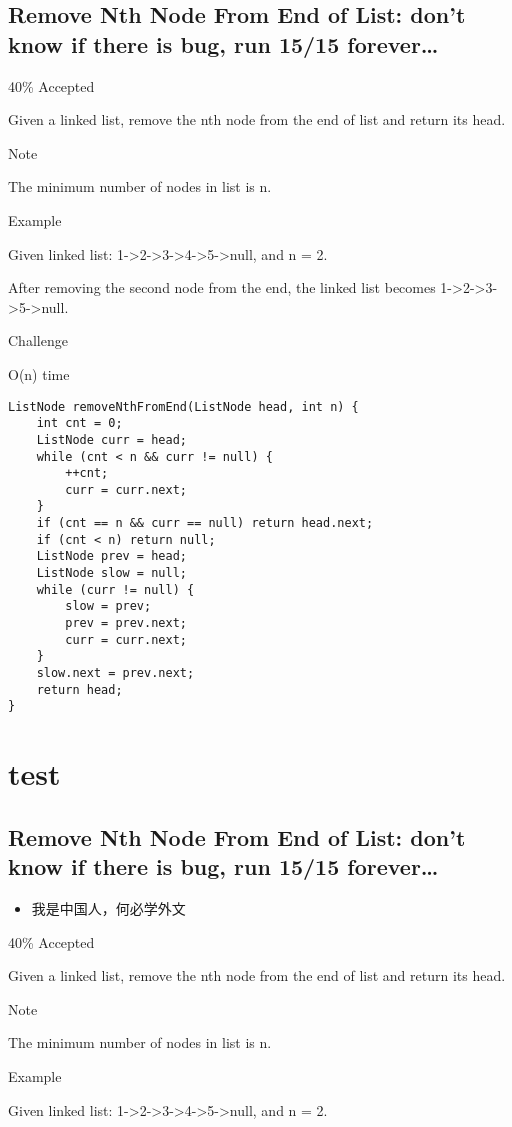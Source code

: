 \documentclass[9pt, b5paaper]{book}
\begin{document}
\section{Remove Nth Node From End of List: don't know if there is bug, run 15/15 forever\ldots{}}
\label{sec-1-58}

40\% Accepted

Given a linked list, remove the nth node from the end of list and return its head.

Note

The minimum number of nodes in list is n.

Example

Given linked list: 1->2->3->4->5->null, and n = 2.

After removing the second node from the end, the linked list becomes 1->2->3->5->null.

Challenge

O(n) time
\begin{verbatim}
ListNode removeNthFromEnd(ListNode head, int n) {
    int cnt = 0;
    ListNode curr = head;
    while (cnt < n && curr != null) {
        ++cnt;
        curr = curr.next;
    }
    if (cnt == n && curr == null) return head.next;
    if (cnt < n) return null;
    ListNode prev = head;
    ListNode slow = null;
    while (curr != null) {
        slow = prev;
        prev = prev.next;
        curr = curr.next;
    }
    slow.next = prev.next;
    return head;
}
\end{verbatim}
\chapter{test}
\label{sec-2}
\section{Remove Nth Node From End of List: don't know if there is bug, run 15/15 forever\ldots{}}
\label{sec-2-1}
\begin{itemize}
\item 我是中国人，何必学外文
\end{itemize}
40\% Accepted

Given a linked list, remove the nth node from the end of list and return its head.

Note

The minimum number of nodes in list is n.

Example

Given linked list: 1->2->3->4->5->null, and n = 2.
\end{document}
